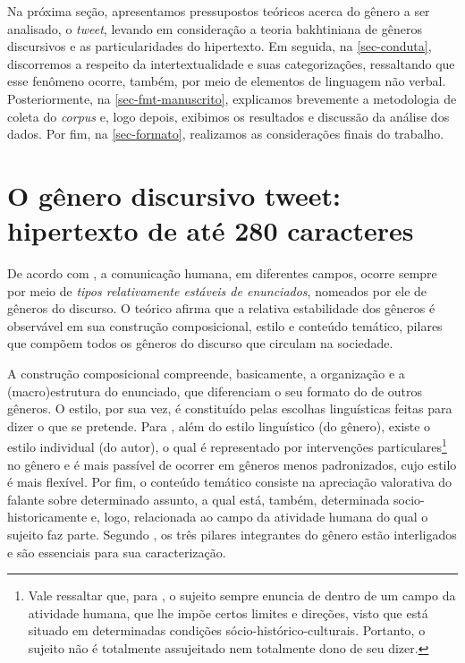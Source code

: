 \documentclass{textolivre}
\begin{document}
Na próxima seção, apresentamos pressupostos teóricos acerca do gênero a ser analisado, o \textit{tweet}, levando em consideração a teoria bakhtiniana de gêneros discursivos e as particularidades do hipertexto. Em seguida, na \cref{sec-conduta}, discorremos a respeito da intertextualidade e suas categorizações, ressaltando que esse fenômeno ocorre, também, por meio de elementos de linguagem não verbal. Posteriormente, na \cref{sec-fmt-manuscrito}, explicamos brevemente a metodologia de coleta do \textit{corpus} e, logo depois, exibimos os resultados e discussão da análise dos dados. Por fim, na \cref{sec-formato}, realizamos as considerações finais do trabalho.

\section{O gênero discursivo tweet: hipertexto de até 280 caracteres}\label{sec-normas}
De acordo com \textcite{bakhtin_os_2011}, a comunicação humana, em diferentes campos, ocorre sempre por meio de \textit{tipos relativamente estáveis de enunciados}, nomeados por ele de gêneros do discurso. O teórico afirma que a relativa estabilidade dos gêneros é observável em sua construção composicional, estilo e conteúdo temático, pilares que compõem todos os gêneros do discurso que circulam na sociedade.

A construção composicional compreende, basicamente, a organização e a (macro)estrutura do enunciado, que diferenciam o seu formato do de outros gêneros. O estilo, por sua vez, é constituído pelas escolhas linguísticas feitas para dizer o que se pretende. Para \textcite{bakhtin_os_2011}, além do estilo linguístico (do gênero), existe o estilo individual (do autor), o qual é representado por intervenções particulares\footnote{Vale ressaltar que, para \textcite{bakhtin_os_2011}, o sujeito sempre enuncia de dentro de um campo da atividade humana, que lhe impõe certos limites e direções, visto que está situado em determinadas condições sócio-histórico-culturais. Portanto, o sujeito não é totalmente assujeitado nem totalmente dono de seu dizer.} no gênero e é mais passível de ocorrer em gêneros menos padronizados, cujo estilo é mais flexível. Por fim, o conteúdo temático consiste na apreciação valorativa do falante sobre determinado assunto, a qual está, também, determinada socio-historicamente e, logo, relacionada ao campo da atividade humana do qual o sujeito faz parte. Segundo \textcite{bakhtin_os_2011}, os três pilares integrantes do gênero estão interligados e são essenciais para sua caracterização.
\end{document}
